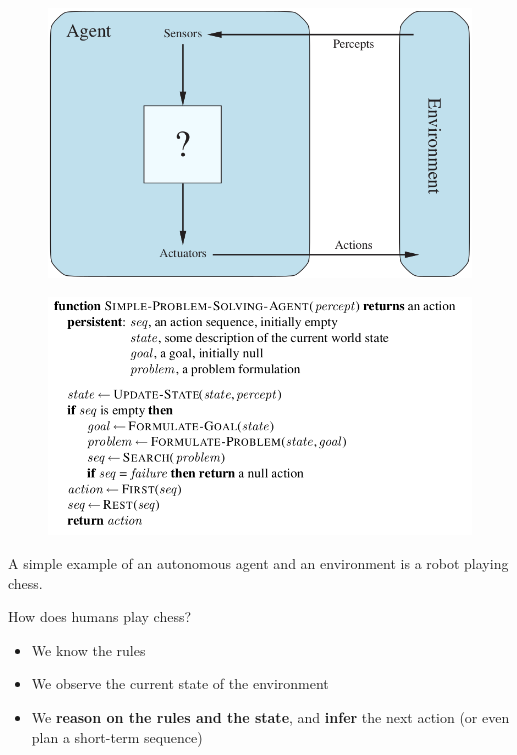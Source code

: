 \begin{center}
    \begin{minipage}[t]{0.3\textwidth}
        \begin{figure}[H]
            \includegraphics[width=\textwidth]{img/agent.png}
        \end{figure}
    \end{minipage}
    \hspace{2cm}
    \begin{minipage}[t]{0.4\textwidth}
        \begin{figure}[H]
            \includegraphics[width=\textwidth]{img/simpleprobsolving.png}
        \end{figure}
    \end{minipage}
\end{center}

A simple example of an autonomous agent and an environment is a robot playing chess.

How does humans play chess? 
\begin{itemize}
    \item We know the rules
    \item We observe the current state of the environment
    \item We \textbf{reason on the rules and the state}, and \textbf{infer} the next action (or even plan a short-term sequence)
\end{itemize}

